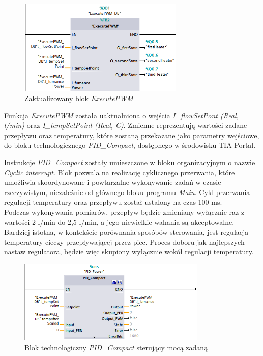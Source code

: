 \documentclass[a4paper,twoside,12pt]{book}
\begin{document}
\begin{figure}[h]
	\centering
	\includegraphics[width=0.7\textwidth]{./img/executePWMrelugation.png}
	\caption{Zaktualizowany blok \textit{ExecutePWM}}
	\label{fig:Aktualizacja funkcji ExecutePWM}
\end{figure}

Funkcja \textit{ExecutePWM} została uaktualniona o wejścia \textit{I\_flowSetPont (Real, l/min)} oraz \textit{I\_tempSetPoint (Real, \textdegree{}C)}. Zmienne reprezentują wartości zadane przepływu oraz temperatury, które zostaną przekazane jako parametry wejściowe, do bloku technologicznego \textit{PID\_Compact}, dostępnego w środowisku TIA Portal.

\newpage
Instrukcje \textit{PID\_Compact} zostały umieszczone w bloku organizacyjnym o nazwie \textit{Cyclic interrupt}. Blok pozwala na realizację cyklicznego przerwania, które umożliwia skoordynowane i powtarzalne wykonywanie zadań w czasie rzeczywistym, niezależnie od głównego bloku programu \textit{Main}. Cykl przerwania regulacji temperatury oraz przepływu został ustalony na czas 100 ms.\\

Podczas wykonywania pomiarów, przepływ będzie zmieniany wyłącznie raz z wartości 2 l/min do 2,5 l/min, a jego niewielkie wahania są akceptowalne. Bardziej istotna, w kontekście porównania sposóbów sterowania, jest regulacja temperatury cieczy przepływającej przez piec. Proces doboru jak najlepszych nastaw regulatora, będzie więc skupiony wyłącznie wokół regulacji temperatury.

\begin{figure}[h]
	\centering
	\includegraphics[width=0.8\textwidth]{./img/PID_Compact.png}
	\caption{Blok technologiczny \textit{PID\_Compact} sterujący mocą zadaną}
	\label{fig:PID_Compact}
\end{figure}
\end{document}
